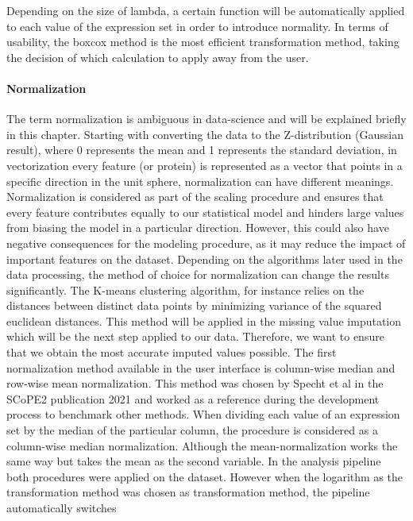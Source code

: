 \documentclass[
  11pt,
]{article}
\begin{document}
Depending on the size of lambda, a certain function will be
automatically applied to each value of the expression set in order to
introduce normality. In terms of usability, the boxcox method is the
most efficient transformation method, taking the decision of which
calculation to apply away from the user.

\hypertarget{normalization}{%
\paragraph{Normalization}\label{normalization}}

The term normalization is ambiguous in data-science and will be
explained briefly in this chapter. Starting with converting the data to
the Z-distribution (Gaussian result), where 0 represents the mean and 1
represents the standard deviation, in vectorization every feature (or
protein) is represented as a vector that points in a specific direction
in the unit sphere, normalization can have different meanings.
Normalization is considered as part of the scaling procedure and ensures
that every feature contributes equally to our statistical model and
hinders large values from biasing the model in a particular direction.
However, this could also have negative consequences for the modeling
procedure, as it may reduce the impact of important features on the
dataset. Depending on the algorithms later used in the data processing,
the method of choice for normalization can change the results
significantly. The K-means clustering algorithm, for instance relies on
the distances between distinct data points by minimizing variance of the
squared euclidean distances. This method will be applied in the missing
value imputation which will be the next step applied to our data.
Therefore, we want to ensure that we obtain the most accurate imputed
values possible. The first normalization method available in the user
interface is column-wise median and row-wise mean normalization. This
method was chosen by Specht et al in the SCoPE2 publication 2021
\citep{Specht2021} and worked as a reference during the development
process to benchmark other methods. When dividing each value of an
expression set by the median of the particular column, the procedure is
considered as a column-wise median normalization. Although the
mean-normalization works the same way but takes the mean as the second
variable. In the analysis pipeline both procedures were applied on the
dataset. However when the logarithm as the transformation method was
chosen as transformation method, the pipeline automatically switches
\end{document}
